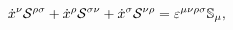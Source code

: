 \begin{equation}
\dot{x}^{\nu }\mathcal{S}^{\rho \sigma }+\dot{x}^{\rho }\mathcal{S}^{\sigma
\nu }+\dot{x}^{\sigma }\mathcal{S}^{\nu \rho }=\varepsilon ^{\mu \nu \rho
\sigma }\Bbb{S}_{\mu },  \label{inverse}
\end{equation}

